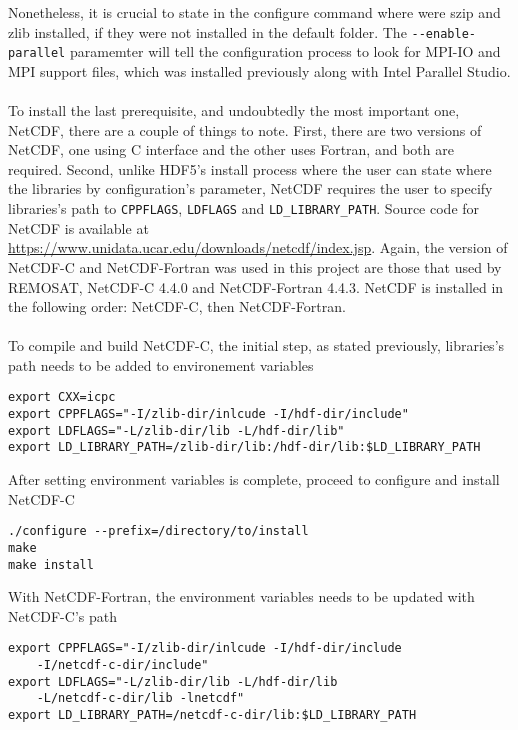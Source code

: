 Nonetheless, it is crucial to state in the configure command where were szip and zlib installed, if they were not installed in the default folder. The \verb|--enable-parallel| paramemter will tell the configuration process to look for MPI-IO and MPI support files, which was installed previously along with Intel Parallel Studio. \\
~\\
To install the last prerequisite, and undoubtedly the most important one, NetCDF, there are a couple of things to note. First, there are two versions of NetCDF, one using C interface and the other uses Fortran, and both are required. Second, unlike HDF5's install process where the user can state where the libraries by configuration's parameter, NetCDF requires the user to specify libraries's path to \verb|CPPFLAGS|, \verb|LDFLAGS| and \verb|LD_LIBRARY_PATH|. Source code for NetCDF is available at \url{https://www.unidata.ucar.edu/downloads/netcdf/index.jsp}. Again, the version of NetCDF-C and NetCDF-Fortran was used in this project are those that used by REMOSAT, NetCDF-C 4.4.0 and NetCDF-Fortran 4.4.3. NetCDF is installed in the following order: NetCDF-C, then NetCDF-Fortran. \\
~\\
To compile and build NetCDF-C, the initial step, as stated previously, libraries's path needs to be added to environement variables
\begin{center}
\begin{BVerbatim}
export CXX=icpc
export CPPFLAGS="-I/zlib-dir/inlcude -I/hdf-dir/include"
export LDFLAGS="-L/zlib-dir/lib -L/hdf-dir/lib"
export LD_LIBRARY_PATH=/zlib-dir/lib:/hdf-dir/lib:$LD_LIBRARY_PATH
\end{BVerbatim}
\end{center}
After setting environment variables is complete, proceed to configure and install NetCDF-C
\begin{center}
\begin{BVerbatim}
./configure --prefix=/directory/to/install
make
make install
\end{BVerbatim}
\end{center}
With NetCDF-Fortran, the environment variables needs to be updated with NetCDF-C's path
\begin{center}
\begin{BVerbatim}
export CPPFLAGS="-I/zlib-dir/inlcude -I/hdf-dir/include 
	-I/netcdf-c-dir/include"
export LDFLAGS="-L/zlib-dir/lib -L/hdf-dir/lib 
	-L/netcdf-c-dir/lib -lnetcdf"
export LD_LIBRARY_PATH=/netcdf-c-dir/lib:$LD_LIBRARY_PATH
\end{BVerbatim}
\end{center}
